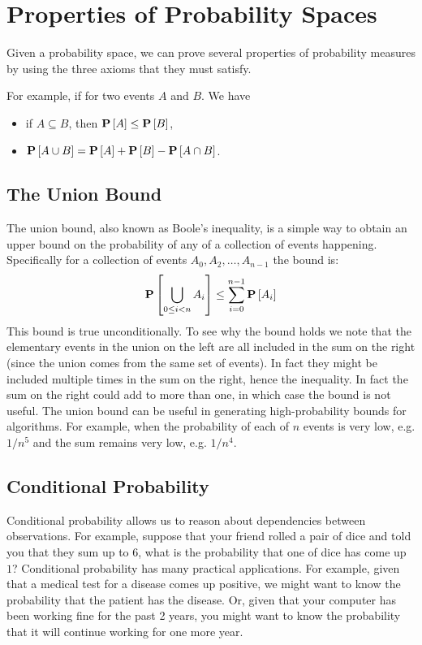 \section{Properties of Probability Spaces}
\label{sec:probability::theory::spaces-properties}

\begin{gram}
Given a probability space, we can prove several properties of
probability measures by using the three axioms that they must satisfy.

For example, if for two events $A$ and $B$.  We have
\begin{itemize}
\item if $A \subseteq B$, then  $\mathbf{P}\left[{A}\right] \le \mathbf{P}\left[{B}\right]$,
\item $\mathbf{P}\left[{A \cup B}\right] = \mathbf{P}\left[{A}\right]  + \mathbf{P}\left[{B}\right] -  \mathbf{P}\left[{A \cap B}\right]$.
\end{itemize}
\end{gram}

\subsection{The Union Bound}
\label{sec:probability::theory::union-bound}
\begin{gram}
The union bound, also known as Boole's inequality, is a simple way to
obtain an upper bound on the probability of any of a collection of events
happening.  Specifically for a collection of events
$A_0, A_2, \ldots, A_{n-1}$ the bound is:
\[
\mathbf{P}\left[{\bigcup_{0 \leq i < n} A_i}\right] \leq \sum_{i=0}^{n-1} \mathbf{P}\left[{A_i}\right] 
\]
This bound is true unconditionally.
%
To see why the bound holds we note that the elementary events
in the union on the left are all included in the sum on the right
(since the union comes from the same set of events).  
%
In fact they
might be included multiple times in the sum on the right, hence the
inequality.  In fact the sum on the right could add to more than one, in
which case the bound is not useful.  
%
The union bound can be useful in generating high-probability bounds
for algorithms. For example, when the probability of each of $n$
events is very low, e.g. $1/n^5$ and the sum remains very low,
e.g. $1/n^4$.
\end{gram}

\subsection{Conditional Probability}
\label{sec:probability::theory::conditional-pr}
\begin{gram}

Conditional probability allows us to reason about dependencies between
observations.  
%
For example, suppose that  your friend rolled a pair of dice and told
you that they sum up to $6$, what is the probability that one of
dice has come up $1$?  
%
Conditional probability has many practical applications.
%
For example, given that a medical test for a disease comes up
positive, we might want to know  the probability that the patient has the disease. 
%
Or, given that your computer has been working fine for the past 2
years, you might want to know the probability that it will continue
working for one more year.
\end{gram}

